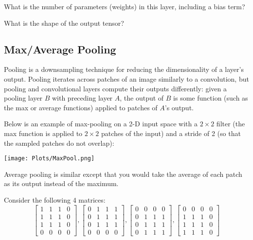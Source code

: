 \problem[2] What is the number of parameters (weights) in this layer, including a bias term?

\problem[3] What is the shape of the output tensor?

 \subsection{Max/Average Pooling}

Pooling is a downsampling technique for reducing the dimensionality of a layer's output. Pooling iterates across patches of an image similarly to a convolution, but pooling and convolutional layers compute their outputs differently: given a pooling layer $B$ with preceding layer $A$, the output of $B$ is some function (such as the max or average functions) applied to patches of $A$'s output.

Below is an example of max-pooling on a 2-D input space with a $2\times 2$ filter (the max function is applied to $2\times 2$ patches of the input) and a stride of 2 (so that the sampled patches do not overlap):

\begin{center}
  \texttt{[image: Plots/MaxPool.png]}
\end{center}

Average pooling is similar except that you would take the average of each patch as its output instead of the maximum.

Consider the following 4 matrices:
$$
\begin{bmatrix}
    1 & 1 & 1 & 0 \\
    1 & 1 & 1 & 0 \\
    1 & 1 & 1 & 0 \\
    0 & 0 & 0 & 0
\end{bmatrix},
%
\begin{bmatrix}
    0 & 1 & 1 & 1 \\
    0 & 1 & 1 & 1 \\
    0 & 1 & 1 & 1 \\
    0 & 0 & 0 & 0
\end{bmatrix},
%
\begin{bmatrix}
	0 & 0 & 0 & 0 \\
    0 & 1 & 1 & 1 \\
    0 & 1 & 1 & 1 \\
    0 & 1 & 1 & 1
\end{bmatrix},
%
\begin{bmatrix}
    0 & 0 & 0 & 0 \\
    1 & 1 & 1 & 0 \\
    1 & 1 & 1 & 0 \\
    1 & 1 & 1 & 0
\end{bmatrix}
$$
\problem[3]

